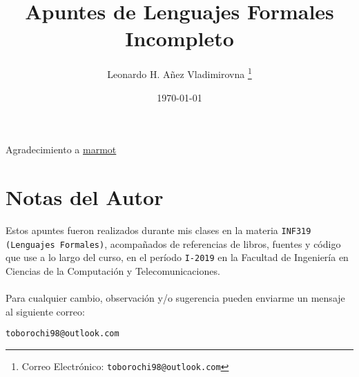 

\title{Apuntes de Lenguajes Formales \\ {\footnotesize Incompleto}}

\author{Leonardo H. Añez Vladimirovna%
  \thanks{Correo Electrónico: \texttt{toborochi98@outlook.com}}}
\date{\today}

\maketitle

Agradecimiento a \href{https://tex.stackexchange.com/users/121799/marmot}{marmot}

\section*{Notas del Autor}
Estos apuntes fueron realizados durante mis clases en la materia \texttt{INF319 (Lenguajes Formales)}, acompañados de referencias de libros, fuentes y código que use a lo largo del curso, en el período \texttt{I-2019} en la Facultad de Ingeniería en Ciencias de la Computación y Telecomunicaciones. 
\\ \vspace{0.5cm} \\
Para cualquier cambio, observación y/o sugerencia pueden enviarme un mensaje al siguiente correo:
\begin{center}
 \texttt{toborochi98@outlook.com}
\end{center}

\tableofcontents
